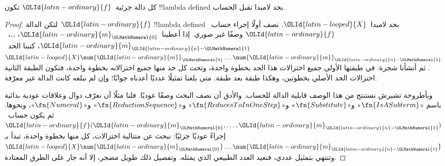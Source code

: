 \documentclass[../../../include/open-logic-section]{subfiles}
\begin{document}

\begin{thm}
كل دالة جزئية~${\OLId{latin-ordinary}{f}}$ تكون !!{lambda defined} بحد لامبدا تقبل الحساب.
\end{thm}

\begin{proof}
لتكن الدالة~${\OLId{latin-ordinary}{f}}$ !!{lambda defined} بحد لامبدا~${\OLId{latin-looped}{X}}$.
نصف أولًا إجراء حساب~${\OLId{latin-ordinary}{f}}$ وصفًا غير صوري.
إذا أعطينا~${\OLId{latin-ordinary}{m}}_{\OLMathNumeral{0}}$، \dots،~${\OLId{latin-ordinary}{m}}_{{\OLId{latin-ordinary}{n}}-{\OLMathNumeral{1}}}$،
كتبنا الحد~${\OLId{latin-looped}{X}} \num {\OLId{latin-ordinary}{m}}_{\OLMathNumeral{0}} \ldots \num {\OLId{latin-ordinary}{m}}_{{\OLId{latin-ordinary}{n}}-{\OLMathNumeral{1}}}$.
ثم أنشأنا شجرة: في طبقتها الأولى جميع اختزالات هذا الحد
بخطوة واحدة، وتحت كل حد منها جميع اختزالاته بخطوة واحدة،
فتكون الطبقة الثانية اختزالات الحد الأصلي بخطوتين،
وهكذا طبقة بعد طبقة. متى بلغنا تمثيلًا عدديًا أعدناه جوابًا؛
وإن لم نبلغه كانت الدالة غير معرّفة.

وبأطروحة تشيرش نستنتج من هذا الوصف قابلية الدالة للحساب.
والأدق أن نصف البحث وصفًا عوديًا. فلنا مثلًا أن نعرّف دوال
وعلاقات عودية بدائية باسم
«$\fn{IsASubterm}$» و«$\fn{Substitute}$»
و«$\fn{ReducesToInOneStep}$» و«$\fn{ReductionSequence}$»
و«$\fn{Numeral}$»، ونحوها.
ثم يكون حساب~${\OLId{latin-ordinary}{f}}({\OLId{latin-ordinary}{m}}_{\OLMathNumeral{0}}, \dots, {\OLId{latin-ordinary}{m}}_{{\OLId{latin-ordinary}{n}}-{\OLMathNumeral{1}}})$ إجراءً عوديًا جزئيًا:
نبحث عن متتالية اختزالات، كل منها بخطوة واحدة، تبدأ
بـ${\OLId{latin-looped}{X}} \num{{\OLId{latin-ordinary}{m}}_{\OLMathNumeral{0}}} \dots \num{{\OLId{latin-ordinary}{m}}_{{\OLId{latin-ordinary}{n}}-{\OLMathNumeral{1}}}}$ وتنتهي بتمثيل عددي،
فنعيد العدد الطبيعي الذي يمثله.
وتفصيل ذلك طويل مضجر، إلا أنه جار على الطرق المعتادة.
\end{proof}
\end{document}
